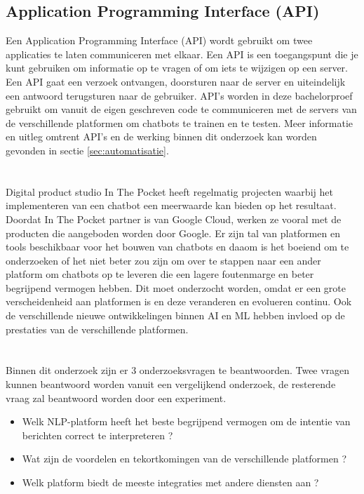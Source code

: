\subsection{Application Programming Interface (API)}
\label{subsec:begrippen-api}

Een Application Programming Interface (API) wordt gebruikt om twee applicaties te laten communiceren met elkaar. Een API is een toegangspunt die je kunt gebruiken om informatie op te vragen of om iets te wijzigen op een server. Een API gaat een verzoek ontvangen, doorsturen naar de server en uiteindelijk een antwoord terugsturen naar de gebruiker. API’s worden in deze bachelorproef gebruikt om vanuit de eigen geschreven code te communiceren met de servers van de verschillende platformen om chatbots te trainen en te testen. Meer informatie en uitleg omtrent API’s en de werking binnen dit onderzoek kan worden gevonden in sectie \ref{sec:automatisatie}.


\newpage
\section{}
\label{sec:probleemstelling}

Digital product studio In The Pocket heeft regelmatig projecten waarbij het implementeren van een chatbot een meerwaarde kan bieden op het resultaat. Doordat In The Pocket partner is van Google Cloud, werken ze vooral met de producten die aangeboden worden door Google. Er zijn tal van platformen en tools beschikbaar voor het bouwen van chatbots en daaom is het boeiend om te onderzoeken of het niet beter zou zijn om over te stappen naar een ander platform om chatbots op te leveren die een lagere foutenmarge en beter begrijpend vermogen hebben. Dit moet onderzocht worden, omdat er een grote verscheidenheid aan platformen is en deze veranderen en evolueren continu. Ook de verschillende nieuwe ontwikkelingen binnen AI en ML hebben invloed op de prestaties van de verschillende platformen.

\section{}
\label{sec:onderzoeksvraag}

Binnen dit onderzoek zijn er 3 onderzoeksvragen te beantwoorden. Twee vragen kunnen beantwoord worden vanuit een vergelijkend onderzoek, de resterende vraag zal beantwoord worden door een experiment.
\begin{itemize}
    \item Welk NLP-platform heeft het beste begrijpend vermogen om de intentie van berichten correct te interpreteren ?
    \item Wat zijn de voordelen en tekortkomingen van de verschillende platformen ?
    \item Welk platform biedt de meeste integraties met andere diensten aan ?
\end{itemize}

